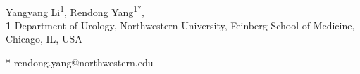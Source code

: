 \documentclass[10pt,letterpaper]{article}
\begin{document}
\vspace*{0.2in}

\begin{flushleft}
	{\Large
		\textbf{} %
	}
	\newline
	\\
	Yangyang Li\textsuperscript{1},
	Rendong Yang\textsuperscript{1*},
	\\
	\bigskip
	\textbf{1} Department of Urology, Northwestern University, Feinberg School of Medicine, Chicago, IL, USA
	\bigskip






	* rendong.yang@northwestern.edu

\end{flushleft}
\end{document}
